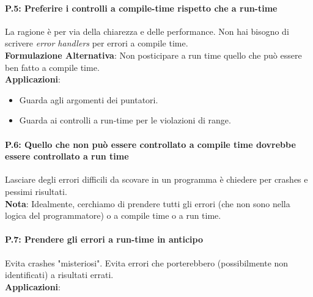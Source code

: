\paragraph{P.5: Preferire i controlli a compile-time rispetto che a run-time}

\textsf{\small La ragione è per via della chiarezza e delle performance. Non hai bisogno di scrivere \emph{error handlers} per errori a compile time.} \\

\textsf{\small \textbf{Formulazione Alternativa}: Non posticipare a run time quello che può essere ben fatto a compile time.} \\

\textsf{\small \textbf{Applicazioni}: }

\begin{itemize}
	\item \textsf{\small Guarda agli argomenti dei puntatori.}
	\item \textsf{\small Guarda ai controlli a run-time per le violazioni di range.}
\end{itemize}

\paragraph{P.6: Quello che non può essere controllato a compile time dovrebbe essere controllato a run time}

\textsf{\small Lasciare degli errori difficili da scovare in un programma è chiedere per crashes e pessimi risultati.} \\

\textsf{\small \textbf{Nota}: Idealmente, cerchiamo di prendere tutti gli errori (che non sono nella logica del programmatore) o a compile time o a run time.} \\


\paragraph{P.7: Prendere gli errori a run-time in anticipo} %

\textsf{\small Evita crashes "misteriosi". Evita errori che porterebbero (possibilmente non identificati) a risultati errati.} \\

\textsf{\small \textbf{Applicazioni}: } \\

